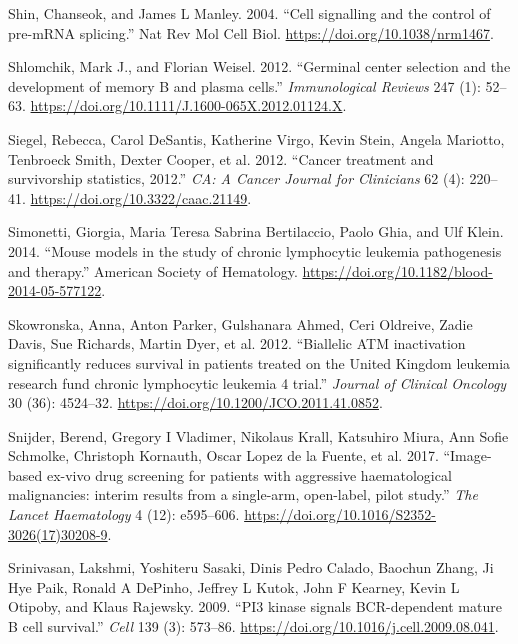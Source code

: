 \documentclass[11pt, a4paper, twosided]{book}
\newenvironment{CSLReferences}%
  {}%
  {\par}
\begin{document}
\begin{CSLReferences}{1}{0}
\leavevmode{}%
Shin, Chanseok, and James L Manley. 2004. {``{Cell signalling and the control of pre-mRNA splicing}.''} Nat Rev Mol Cell Biol. \url{https://doi.org/10.1038/nrm1467}.

\leavevmode{}%
Shlomchik, Mark J., and Florian Weisel. 2012. {``{Germinal center selection and the development of memory B and plasma cells}.''} \emph{Immunological Reviews} 247 (1): 52--63. \url{https://doi.org/10.1111/J.1600-065X.2012.01124.X}.

\leavevmode{}%
Siegel, Rebecca, Carol DeSantis, Katherine Virgo, Kevin Stein, Angela Mariotto, Tenbroeck Smith, Dexter Cooper, et al. 2012. {``{Cancer treatment and survivorship statistics, 2012}.''} \emph{CA: A Cancer Journal for Clinicians} 62 (4): 220--41. \url{https://doi.org/10.3322/caac.21149}.

\leavevmode{}%
Simonetti, Giorgia, Maria Teresa Sabrina Bertilaccio, Paolo Ghia, and Ulf Klein. 2014. {``{Mouse models in the study of chronic lymphocytic leukemia pathogenesis and therapy}.''} American Society of Hematology. \url{https://doi.org/10.1182/blood-2014-05-577122}.

\leavevmode{}%
Skowronska, Anna, Anton Parker, Gulshanara Ahmed, Ceri Oldreive, Zadie Davis, Sue Richards, Martin Dyer, et al. 2012. {``{Biallelic ATM inactivation significantly reduces survival in patients treated on the United Kingdom leukemia research fund chronic lymphocytic leukemia 4 trial}.''} \emph{Journal of Clinical Oncology} 30 (36): 4524--32. \url{https://doi.org/10.1200/JCO.2011.41.0852}.

\leavevmode{}%
Snijder, Berend, Gregory I Vladimer, Nikolaus Krall, Katsuhiro Miura, Ann Sofie Schmolke, Christoph Kornauth, Oscar Lopez de la Fuente, et al. 2017. {``{Image-based ex-vivo drug screening for patients with aggressive haematological malignancies: interim results from a single-arm, open-label, pilot study}.''} \emph{The Lancet Haematology} 4 (12): e595--606. \url{https://doi.org/10.1016/S2352-3026(17)30208-9}.

\leavevmode{}%
Srinivasan, Lakshmi, Yoshiteru Sasaki, Dinis Pedro Calado, Baochun Zhang, Ji Hye Paik, Ronald A DePinho, Jeffrey L Kutok, John F Kearney, Kevin L Otipoby, and Klaus Rajewsky. 2009. {``{PI3 kinase signals BCR-dependent mature B cell survival.}''} \emph{Cell} 139 (3): 573--86. \url{https://doi.org/10.1016/j.cell.2009.08.041}.


\end{CSLReferences}
\end{document}
